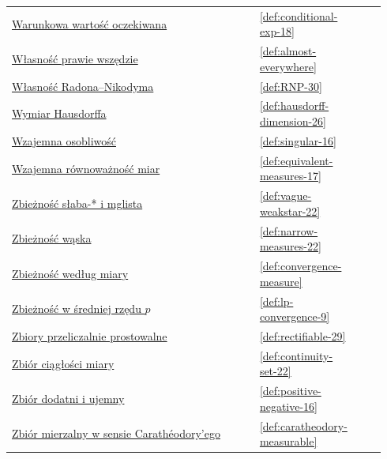 \documentclass[11pt,a4paper,oneside]{book}
\numberwithin{equation}{chapter}
\theoremstyle{plain}
\theoremstyle{definition}
\theoremstyle{remark}
\begin{document}
\begin{longtable}{@{}p{0.72\linewidth}p{0.135\linewidth}p{0.08\linewidth}@{}}
\hyperref[def:conditional-exp-18]{Warunkowa wartość oczekiwana} & \ref*{def:conditional-exp-18} & \pageref*{def:conditional-exp-18} \\
\hyperref[def:almost-everywhere]{Własność prawie wszędzie} & \ref*{def:almost-everywhere} & \pageref*{def:almost-everywhere} \\
\hyperref[def:RNP-30]{Własność Radona--Nikodyma} & \ref*{def:RNP-30} & \pageref*{def:RNP-30} \\
\hyperref[def:hausdorff-dimension-26]{Wymiar Hausdorffa} & \ref*{def:hausdorff-dimension-26} & \pageref*{def:hausdorff-dimension-26} \\
\hyperref[def:singular-16]{Wzajemna osobliwość} & \ref*{def:singular-16} & \pageref*{def:singular-16} \\
\hyperref[def:equivalent-measures-17]{Wzajemna równoważność miar} & \ref*{def:equivalent-measures-17} & \pageref*{def:equivalent-measures-17} \\
\hyperref[def:vague-weakstar-22]{Zbieżność słaba-* i mglista} & \ref*{def:vague-weakstar-22} & \pageref*{def:vague-weakstar-22} \\
\hyperref[def:narrow-measures-22]{Zbieżność wąska} & \ref*{def:narrow-measures-22} & \pageref*{def:narrow-measures-22} \\
\hyperref[def:convergence-measure]{Zbieżność według miary} & \ref*{def:convergence-measure} & \pageref*{def:convergence-measure} \\
\hyperref[def:lp-convergence-9]{Zbieżność w średniej rzędu $p$} & \ref*{def:lp-convergence-9} & \pageref*{def:lp-convergence-9} \\
\hyperref[def:rectifiable-29]{Zbiory przeliczalnie prostowalne} & \ref*{def:rectifiable-29} & \pageref*{def:rectifiable-29} \\
\hyperref[def:continuity-set-22]{Zbiór ciągłości miary} & \ref*{def:continuity-set-22} & \pageref*{def:continuity-set-22} \\
\hyperref[def:positive-negative-16]{Zbiór dodatni i ujemny} & \ref*{def:positive-negative-16} & \pageref*{def:positive-negative-16} \\
\hyperref[def:caratheodory-measurable]{Zbiór mierzalny w sensie Carathéodory'ego} & \ref*{def:caratheodory-measurable} & \pageref*{def:caratheodory-measurable} \\
\end{longtable}
\endgroup
\end{document}

